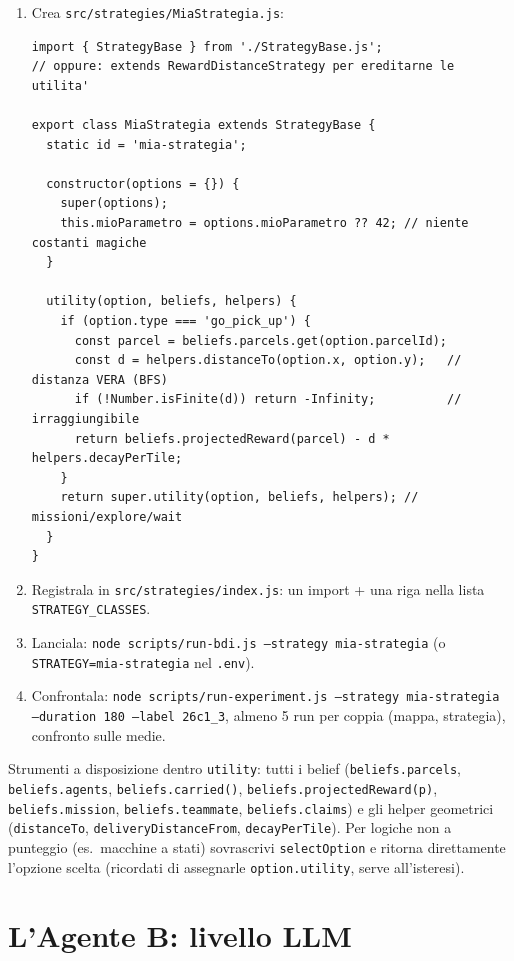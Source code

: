 \documentclass[11pt,a4paper]{article}
\newcommand{\file}[1]{\texttt{#1}}
\newcommand{\code}[1]{\texttt{#1}}
\begin{document}
\begin{enumerate}
  \item Crea \file{src/strategies/MiaStrategia.js}:
\begin{lstlisting}
import { StrategyBase } from './StrategyBase.js';
// oppure: extends RewardDistanceStrategy per ereditarne le utilita'

export class MiaStrategia extends StrategyBase {
  static id = 'mia-strategia';

  constructor(options = {}) {
    super(options);
    this.mioParametro = options.mioParametro ?? 42; // niente costanti magiche
  }

  utility(option, beliefs, helpers) {
    if (option.type === 'go_pick_up') {
      const parcel = beliefs.parcels.get(option.parcelId);
      const d = helpers.distanceTo(option.x, option.y);   // distanza VERA (BFS)
      if (!Number.isFinite(d)) return -Infinity;          // irraggiungibile
      return beliefs.projectedReward(parcel) - d * helpers.decayPerTile;
    }
    return super.utility(option, beliefs, helpers); // missioni/explore/wait
  }
}
\end{lstlisting}
  \item Registrala in \file{src/strategies/index.js}: un import + una riga
    nella lista \code{STRATEGY\_CLASSES}.
  \item Lanciala: \code{node scripts/run-bdi.js --strategy mia-strategia}
    (o \code{STRATEGY=mia-strategia} nel \file{.env}).
  \item Confrontala: \code{node scripts/run-experiment.js --strategy
    mia-strategia --duration 180 --label 26c1\_3}, almeno 5 run per
    coppia (mappa, strategia), confronto sulle medie.
\end{enumerate}

Strumenti a disposizione dentro \code{utility}: tutti i belief
(\code{beliefs.parcels}, \code{beliefs.agents}, \code{beliefs.carried()},
\code{beliefs.projectedReward(p)}, \code{beliefs.mission},
\code{beliefs.teammate}, \code{beliefs.claims}) e gli helper geometrici
(\code{distanceTo}, \code{deliveryDistanceFrom}, \code{decayPerTile}).
Per logiche non a punteggio (es.\ macchine a stati) sovrascrivi
\code{selectOption} e ritorna direttamente l'opzione scelta (ricordati di
assegnarle \code{option.utility}, serve all'isteresi).

\section{L'Agente B: livello LLM}
\end{document}
